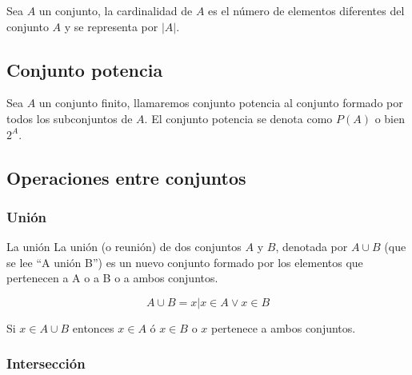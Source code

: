 Sea $A$ un conjunto, la cardinalidad de $A$ es el número de elementos diferentes del conjunto
$A$ y se representa por $|A|$.

\subsection{Conjunto potencia}
Sea $A$ un conjunto finito, llamaremos conjunto potencia al conjunto formado por todos los
subconjuntos de $A$. El conjunto potencia se denota como $P(A)$ o bien $2^A$.

\subsection{Operaciones entre conjuntos}

\def\firstcircle{(0,0) circle (1.5cm)}
\def\secondcircle{(0:2cm) circle (1.5cm)}



\setlength{\parskip}{5mm}

\subsubsection{Unión}

La unión La unión (o reunión) de dos conjuntos $A$ y $B$, denotada por $ A \cup
B $ (que se lee “A unión B”) es un nuevo conjunto formado por los elementos que
pertenecen a A o a B o a ambos conjuntos.

\begin{equation}
    A \cup B = {x | x \in A \vee x \in B}
\end{equation}

Si $x \in A \cup B $ entonces $x \in A $ ó $x \in B$ o $x$ pertenece a ambos
conjuntos.

\begin{figure}[h]
    \centering
\end{figure}

\subsubsection{Intersección}

